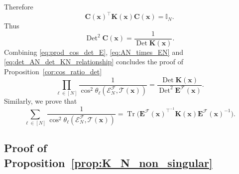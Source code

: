 \documentclass[twoside,11pt]{book}
\numberwithin{theorem}{chapter}
\numberwithin{definition}{chapter}
\numberwithin{proposition}{chapter}
\numberwithin{corollary}{chapter}
\numberwithin{example}{chapter}
\numberwithin{lemma}{chapter}
\numberwithin{assumption}{chapter}
\DeclareMathOperator{\Tr}{Tr}
\DeclareMathOperator{\Det}{Det}
\DeclareMathOperator{\Tran}{\intercal}
\begin{document}
Therefore
\begin{equation}
\bm{C}(\bm{x})^{\Tran} \bm{K}(\bm{x}) \bm{C}(\bm{x}) = \mathbb{I}_{N}.
\end{equation}
Thus
\begin{equation}\label{eq:det_AN_det_KN_relationship}
\Det^{2} \bm{C}(\bm{x}) = \frac{1}{\Det \bm{K}(\bm{x})}.
\end{equation}
Combining \eqref{eq:prod_cos_det_E}, \eqref{eq:AN_times_EN} and \eqref{eq:det_AN_det_KN_relationship} concludes the proof of Proposition~\ref{cor:cos_ratio_det}
\begin{equation}
\prod\limits_{\ell \in [N]} \frac{1}{\cos^{2} \theta_{\ell} \left(\mathcal{E}^{\mathcal{F}}_{N}, \mathcal{T}(\bm{x}) \right)} = \frac{\Det \bm{K}(\bm{x})}{\Det^{2} \bm{E}^{\mathcal{F}}(\bm{x})}.
\end{equation}
Similarly, we prove that
\begin{equation}
\sum\limits_{\ell \in [N]} \frac{1}{\cos^{2} \theta_{\ell} \left(\mathcal{E}^{\mathcal{F}}_{N}, \mathcal{T}(\bm{x}) \right)} = \Tr \bigg(\bm{E}^{\mathcal{F}}(\bm{x})^{\Tran^{-1}}  \bm{K}(\bm{x}) \bm{E}^{\mathcal{F}}(\bm{x})^{-1} \bigg).
\end{equation}


\subsection{Proof of Proposition~\ref{prop:K_N_non_singular}}\label{app:K_N_non_singular}
\end{document}
